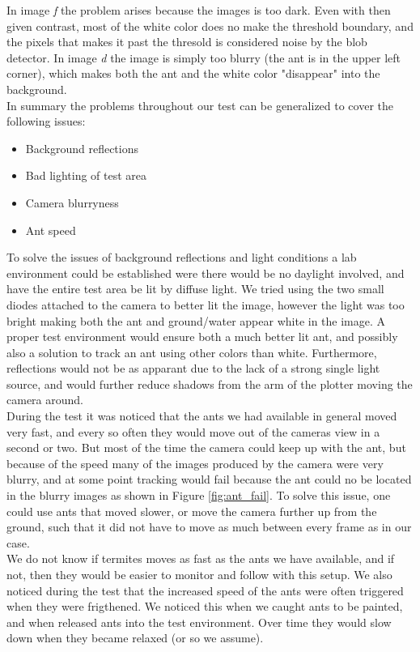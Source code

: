 In image \emph{f} the problem arises because the images is too dark. Even with then given contrast, most of the white color does no make the threshold boundary, and the pixels that makes it past the thresold is considered noise by the blob detector. In image \emph{d} the image is simply too blurry (the ant is in the upper left corner), which makes both the ant and the white color "disappear" into the background.\\

In summary the problems throughout our test can be generalized to cover the following issues:

\begin{itemize}
    \item Background reflections
    \item Bad lighting of test area
    \item Camera blurryness
    \item Ant speed
\end{itemize}

To solve the issues of background reflections and light conditions a lab environment could be established were there would be no daylight involved, and have the entire test area be lit by diffuse light. We tried using the two small diodes attached to the camera to better lit the image, however the light was too bright making both the ant and ground/water appear white in the image. A proper test environment would ensure both a much better lit ant, and possibly also a solution to track an ant using other colors than white. Furthermore, reflections would not be as apparant due to the lack of a strong single light source, and would further reduce shadows from the arm of the plotter moving the camera around.\\

During the test it was noticed that the ants we had available in general moved very fast, and every so often they would move out of the cameras view in a second or two. But most of the time the camera could keep up with the ant, but because of the speed many of the images produced by the camera were very blurry, and at some point tracking would fail because the ant could no be located in the blurry images as shown in Figure \ref{fig:ant_fail}. To solve this issue, one could use ants that moved slower, or move the camera further up from the ground, such that it did not have to move as much between every frame as in our case. \\

We do not know if termites moves as fast as the ants we have available, and if not, then they would be easier to monitor and follow with this setup. We also noticed during the test that the increased speed of the ants were often triggered when they were frigthened. We noticed this when we caught ants to be painted, and when released ants into the test environment. Over time they would slow down when they became relaxed (or so we assume). \\


